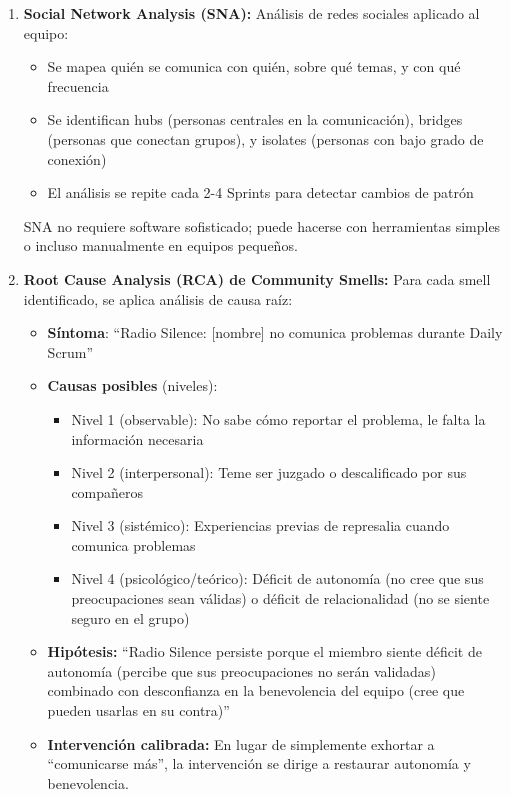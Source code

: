 \begin{enumerate}

\item \textbf{Social Network Analysis (SNA):} Análisis de redes sociales aplicado al equipo:
\begin{itemize}
\item Se mapea quién se comunica con quién, sobre qué temas, y con qué frecuencia
\item Se identifican hubs (personas centrales en la comunicación), bridges (personas que conectan grupos), y isolates (personas con bajo grado de conexión)
\item El análisis se repite cada 2-4 Sprints para detectar cambios de patrón \cite{saeeda2024nontechnicaldebt, caballero2022communitysmells}
\end{itemize}

SNA no requiere software sofisticado; puede hacerse con herramientas simples o incluso manualmente en equipos pequeños.

\item \textbf{Root Cause Analysis (RCA) de Community Smells:} Para cada smell identificado, se aplica análisis de causa raíz:
\begin{itemize}
\item \textbf{Síntoma}: ``Radio Silence: [nombre] no comunica problemas durante Daily Scrum''
\item \textbf{Causas posibles} (niveles):
  \begin{itemize}
  \item Nivel 1 (observable): No sabe cómo reportar el problema, le falta la información necesaria
  \item Nivel 2 (interpersonal): Teme ser juzgado o descalificado por sus compañeros
  \item Nivel 3 (sistémico): Experiencias previas de represalia cuando comunica problemas
  \item Nivel 4 (psicológico/teórico): Déficit de autonomía (no cree que sus preocupaciones sean válidas) o déficit de relacionalidad (no se siente seguro en el grupo)
  \end{itemize}
\item \textbf{Hipótesis:} ``Radio Silence persiste porque el miembro siente déficit de autonomía (percibe que sus preocupaciones no serán validadas) combinado con desconfianza en la benevolencia del equipo (cree que pueden usarlas en su contra)''
\item \textbf{Intervención calibrada:} En lugar de simplemente exhortar a ``comunicarse más'', la intervención se dirige a restaurar autonomía y benevolencia.
\end{itemize}


\end{enumerate}
